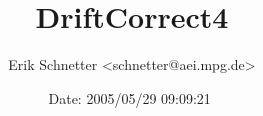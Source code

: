 %
%
%
%


\documentclass{article}

\usepackage{../../../../doc/latex/cactus}



\author{Erik Schnetter \textless schnetter@aei.mpg.de\textgreater}

\title{DriftCorrect4}

\date{$ $Date: 2005/05/29 09:09:21 $ $}

\maketitle



\begin{abstract}

\end{abstract}



